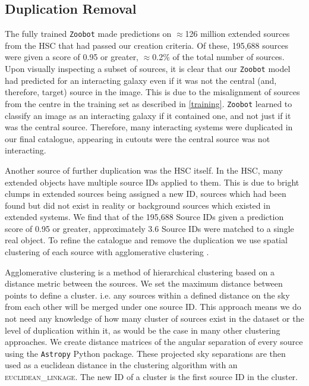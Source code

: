 \subsection{Duplication Removal}\label{dup_rem}
\noindent The fully trained \texttt{Zoobot} made predictions on $\approx$126 million extended sources from the HSC that had passed our creation criteria. Of these, 195,688 sources were given a score of 0.95 or greater, $\approx$0.2\% of the total number of sources. Upon visually inspecting a subset of sources, it is clear that our \texttt{Zoobot} model had predicted for an interacting galaxy even if it was not the central (and, therefore, target) source in the image. This is due to the misalignment of sources from the centre in the training set as described in \DIFdelbegin {}\DIFdelend \DIFaddbegin {}\DIFaddend \ref{training}. \texttt{Zoobot} learned to classify an image as an interacting galaxy if it contained one, and not just if it was the central source. Therefore, many interacting systems were duplicated in our final catalogue, appearing in cutouts were the central source was not interacting.

Another source of further duplication was the HSC itself. In the HSC, many extended objects have multiple source IDs applied to them. This is due to bright clumps in extended sources being assigned a new ID, sources which had been found but did not exist in reality or background sources which existed in extended systems. We find that of the 195,688 Source IDs given a prediction score of 0.95 or greater, approximately 3.6 Source IDs were matched to a single real object. To refine the catalogue and remove the duplication we use spatial clustering of each source with agglomerative clustering \citep[an introduction and description of hierarchical clustering, including agglomerative clustering, can be found in][]{nielsen16}.

Agglomerative clustering is a method of hierarchical clustering based on a distance metric between the sources. We set the maximum distance between points to define a cluster. i.e. any sources within a defined distance on the sky from each other will be merged under one source ID. This approach means we do not need any knowledge of how many cluster of sources exist in the dataset or the level of duplication within it, as would be the case in many other clustering approaches. We create distance matrices of the angular separation of every source using the \texttt{Astropy} Python package. These projected sky separations are then used as a euclidean distance in the clustering algorithm with an \textsc{euclidean\_linkage}. The new ID of a cluster is the first source ID in the cluster. 

